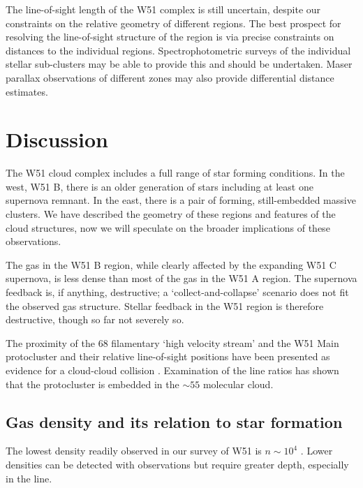 

The line-of-sight length of the W51 complex is still uncertain, despite our
constraints on the relative geometry of different regions.  The best prospect
for resolving the line-of-sight structure of the region is via precise
constraints on distances to the individual regions.  Spectrophotometric surveys
of the individual stellar sub-clusters may be able to provide this and should
be undertaken.  Maser parallax observations of different zones may also provide
differential distance estimates.

\section{Discussion}
The W51 cloud complex includes a full range of star forming conditions.  In the
west, W51 B, there is an older generation of stars including at least one supernova
remnant.  In the east, there is a pair of forming, still-embedded massive clusters.
We have described the geometry of these regions and features of the cloud structures,
now we will speculate on the broader implications of these observations.

The gas in the W51 B region, while clearly affected by the expanding W51 C
supernova, is less dense than most of the gas in the W51 A region.  The
supernova feedback is, if anything, destructive; a `collect-and-collapse'
scenario does not fit the observed gas structure.  Stellar feedback in the W51
region is therefore destructive, though so far not severely so.

The proximity of the 68 \kms filamentary `high velocity stream' and the W51
Main protocluster and their relative line-of-sight positions have been
presented as evidence for a cloud-cloud collision \citep{Kang2010a}.
Examination of the \formaldehyde line ratios has shown that the protocluster is
embedded in the $\sim55$ \kms molecular cloud.  


\subsection{Gas density and its relation to star formation}
The lowest density readily observed in our survey of W51 is $n\sim10^4$ \percc.
Lower densities can be detected with \formaldehyde observations but require
greater depth, especially in the \twotwo line.

